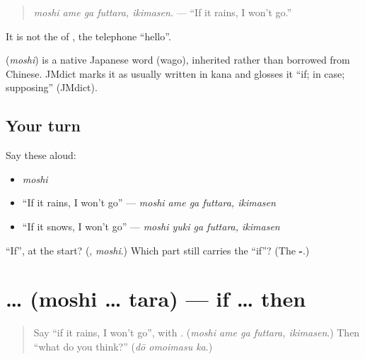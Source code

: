 \begin{quote}
\emph{moshi ame ga futtara, ikimasen.} — \textquotedblleft{}If it rains, I won't go.\textquotedblright{}
\end{quote}

It is not the \textbf{} of \textbf{}, the telephone \textquotedblleft{}hello\textquotedblright{}.

\begin{cousinweb}
\textbf{} (\emph{moshi}) is a native Japanese word (wago), inherited rather than borrowed from Chinese. JMdict marks it as usually written in kana and glosses it \textquotedblleft{}if; in case; supposing\textquotedblright{} (JMdict).
\end{cousinweb}

\subsection*{Your turn}
Say these aloud:

\begin{itemize}
\raggedright
  \item \emph{moshi}
  \item \textquotedblleft{}If it rains, I won't go\textquotedblright{} — \emph{moshi ame ga futtara, ikimasen}
  \item \textquotedblleft{}If it snows, I won't go\textquotedblright{} — \emph{moshi yuki ga futtara, ikimasen}
\end{itemize}

\begin{tcolorbox}[breakable,colback=teal!4,colframe=teal!35!black,title={Before you move on}]
\textquotedblleft{}If\textquotedblright{}, at the start? (\textbf{}, \emph{moshi}.) Which part still carries the \textquotedblleft{}if\textquotedblright{}? (The \textbf{-}.)
\end{tcolorbox}
\section[\texorpdfstring{\ja{もし} … \ja{たら} (moshi … tara)}{もし … たら (moshi … tara)}]{ …  (moshi … tara) — if … then}

\label{lesson:JA-C260-moshi-tara}



\begin{quote}
Say \textquotedblleft{}if it rains, I won't go\textquotedblright{}, with \textbf{}. (\emph{moshi ame ga futtara, ikimasen}.) Then \textquotedblleft{}what do you think?\textquotedblright{} (\emph{dō omoimasu ka}.)
\end{quote}

